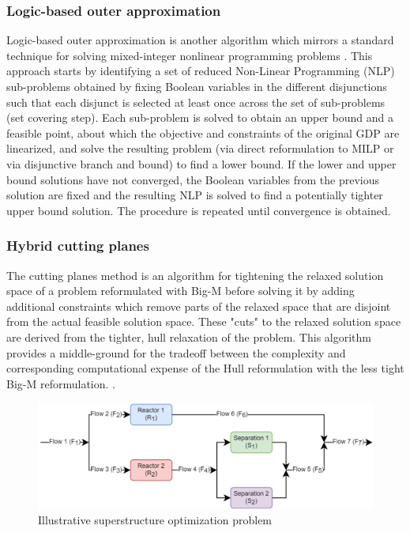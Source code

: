 \documentclass{juliacon}
\begin{document}
\subsubsection{Logic-based outer approximation}
Logic-based outer approximation is another algorithm which mirrors a standard technique for solving mixed-integer nonlinear programming problems \cite{E.Grossmann2009}. This approach starts by identifying a set of reduced Non-Linear Programming (NLP) sub-problems obtained by fixing Boolean variables in the different disjunctions such that each disjunct is selected at least once across the set of sub-problems (set covering step). 
Each sub-problem is solved to obtain an upper bound and a feasible point, about which the objective and constraints of the original GDP are linearized, and solve the resulting problem (via direct reformulation to MILP or via disjunctive branch and bound) to find a lower bound. If the lower and upper bound solutions have not converged, the Boolean variables from the previous solution are fixed and the resulting NLP is solved to find a potentially tighter upper bound solution. The procedure is repeated until convergence is obtained.

\subsubsection{Hybrid cutting planes}
The cutting planes method is an algorithm for tightening the relaxed solution space of a problem reformulated with Big-M before solving it by adding additional constraints which remove parts of the relaxed space that are disjoint from the actual feasible solution space. These "cuts" to the relaxed solution space are derived from the tighter, hull relaxation of the problem. This algorithm provides a middle-ground for the tradeoff between the complexity and corresponding computational expense of the Hull reformulation with the less tight Big-M reformulation. \cite{trespalacios_grossmann_2016}. 

\begin{figure}
    \centering
    \includegraphics[scale=0.6]{superstructure_pfd.png}
    \caption{Illustrative superstructure optimization problem}
    \label{fig:superstruct_opt_diagram}
\end{figure}
\end{document}
